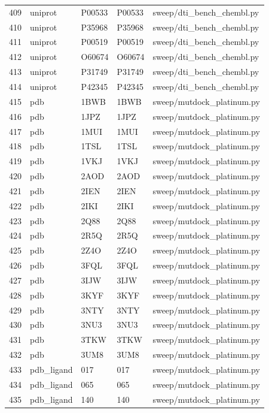{\begin{longtable}{rllp{3.2cm}p{4.2cm}}
409 & uniprot & P00533 & P00533 & sweep/dti\_bench\_chembl.py\\
410 & uniprot & P35968 & P35968 & sweep/dti\_bench\_chembl.py\\
411 & uniprot & P00519 & P00519 & sweep/dti\_bench\_chembl.py\\
412 & uniprot & O60674 & O60674 & sweep/dti\_bench\_chembl.py\\
413 & uniprot & P31749 & P31749 & sweep/dti\_bench\_chembl.py\\
414 & uniprot & P42345 & P42345 & sweep/dti\_bench\_chembl.py\\
415 & pdb & 1BWB & 1BWB & sweep/mutdock\_platinum.py\\
416 & pdb & 1JPZ & 1JPZ & sweep/mutdock\_platinum.py\\
417 & pdb & 1MUI & 1MUI & sweep/mutdock\_platinum.py\\
418 & pdb & 1TSL & 1TSL & sweep/mutdock\_platinum.py\\
419 & pdb & 1VKJ & 1VKJ & sweep/mutdock\_platinum.py\\
420 & pdb & 2AOD & 2AOD & sweep/mutdock\_platinum.py\\
421 & pdb & 2IEN & 2IEN & sweep/mutdock\_platinum.py\\
422 & pdb & 2IKI & 2IKI & sweep/mutdock\_platinum.py\\
423 & pdb & 2Q88 & 2Q88 & sweep/mutdock\_platinum.py\\
424 & pdb & 2R5Q & 2R5Q & sweep/mutdock\_platinum.py\\
425 & pdb & 2Z4O & 2Z4O & sweep/mutdock\_platinum.py\\
426 & pdb & 3FQL & 3FQL & sweep/mutdock\_platinum.py\\
427 & pdb & 3IJW & 3IJW & sweep/mutdock\_platinum.py\\
428 & pdb & 3KYF & 3KYF & sweep/mutdock\_platinum.py\\
429 & pdb & 3NTY & 3NTY & sweep/mutdock\_platinum.py\\
430 & pdb & 3NU3 & 3NU3 & sweep/mutdock\_platinum.py\\
431 & pdb & 3TKW & 3TKW & sweep/mutdock\_platinum.py\\
432 & pdb & 3UM8 & 3UM8 & sweep/mutdock\_platinum.py\\
433 & pdb\_ligand & 017 & 017 & sweep/mutdock\_platinum.py\\
434 & pdb\_ligand & 065 & 065 & sweep/mutdock\_platinum.py\\
435 & pdb\_ligand & 140 & 140 & sweep/mutdock\_platinum.py\\

\end{longtable}}
